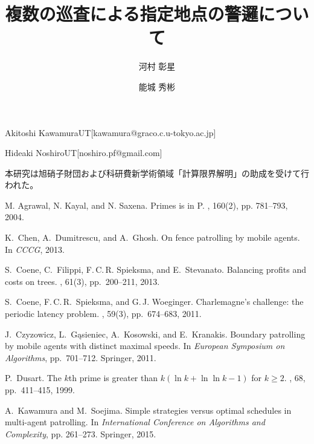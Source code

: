 \documentclass[submit,techrep]{ipsj}
\begin{document}
\title{複数の巡査による指定地点の警邏について}






\author{河村 彰星}{Akitoshi Kawamura}{UT}[kawamura@graco.c.u-tokyo.ac.jp]
\author{能城 秀彬}{Hideaki Noshiro}{UT}[noshiro.pf@gmail.com]






\maketitle





\begin{acknowledgment}
  本研究は旭硝子財団および科研費新学術領域「計算限界解明」の助成を受けて行われた。
\end{acknowledgment}

% 
% 

\begin{thebibliography}{1}

M. Agrawal, N. Kayal, and N. Saxena.
\newblock Primes is in P.
, 160(2), pp. 781--793, 2004.

K.~Chen, A.~Dumitrescu, and A.~Ghosh.
\newblock On fence patrolling by mobile agents.
\newblock In {\em CCCG}, 2013.

S.~Coene, C.~Filippi, F.\,C.\,R. Spieksma, and E.~Stevanato.
\newblock Balancing profits and costs on trees.
, 61(3), pp.~200--211, 2013.

S.~Coene, F.\,C.\,R.~Spieksma, and G.\,J. Woeginger.
\newblock Charlemagne's challenge: the periodic latency problem.
, 59(3), pp.~674--683, 2011.

J.~Czyzowicz, L.~G{\k{a}}sieniec, A.~Kosowski, and E.~Kranakis.
\newblock Boundary patrolling by mobile agents with distinct maximal speeds.
\newblock In {\em European Symposium on Algorithms}, pp.~701--712. Springer,
  2011.

P.~Dusart.
\newblock The $k$th prime is greater than $k (\ln k + \ln \ln k - 1)$ for $k \geq 2$.
, 68, pp.~411--415, 1999.

A.~Kawamura and M.~Soejima.
\newblock Simple strategies versus optimal schedules in multi-agent patrolling.
\newblock In {\em International Conference on Algorithms and Complexity}, pp.
  261--273. Springer, 2015.

\end{thebibliography}
\end{document}
